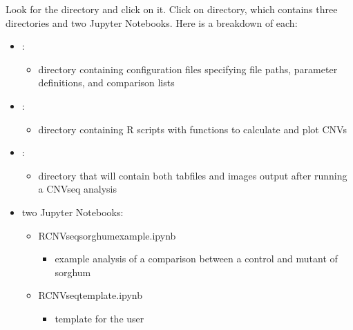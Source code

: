\documentclass[letterpaper,10pt,english]{sphinxhowto}
\begin{document}
\sphinxAtStartPar
Look for the directory  and click on it. Click on  directory, which contains three directories and two Jupyter Notebooks. Here is a breakdown of each:
\begin{itemize}
\item {} 
\sphinxAtStartPar
{}:
\begin{itemize}
\item {} 
\sphinxAtStartPar
directory containing configuration files specifying file paths, parameter definitions, and comparison lists

\end{itemize}

\item {} 
\sphinxAtStartPar
{}:
\begin{itemize}
\item {} 
\sphinxAtStartPar
directory containing R scripts with functions to calculate and plot CNVs

\end{itemize}

\item {} 
\sphinxAtStartPar
{}:
\begin{itemize}
\item {} 
\sphinxAtStartPar
directory that will contain both tab\sphinxhyphen{}files and images output after running a CNVseq analysis

\end{itemize}

\item {} 
\sphinxAtStartPar
two Jupyter Notebooks:
\begin{itemize}
\item {} 
\sphinxAtStartPar
RCNV\sphinxhyphen{}seq\sphinxhyphen{}sorghum\sphinxhyphen{}example.ipynb
\begin{itemize}
\item {} 
\sphinxAtStartPar
example analysis of a comparison between a control and mutant of sorghum

\end{itemize}

\item {} 
\sphinxAtStartPar
RCNV\sphinxhyphen{}seq\sphinxhyphen{}template.ipynb
\begin{itemize}
\item {} 
\sphinxAtStartPar
template for the user

\end{itemize}

\end{itemize}

\end{itemize}
\end{document}
